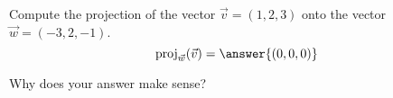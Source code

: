 \begin{problem}
Compute the projection of the vector $\vec{v}=(1,2,3)$ onto the vector $\vec{w} = (-3,2,-1)$.
\[
\textrm{proj}_{\vec{w}}(\vec{v}) = \answer{(0,0,0)}
\]
\begin{problem}
Why does your answer make sense?
\begin{multipleChoice}
\end{multipleChoice}
\end{problem}
\end{problem}